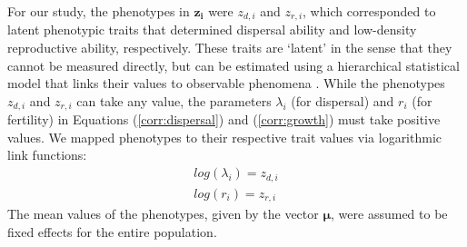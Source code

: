 For our study, the phenotypes in $\bm{z_{i}}$ were $z_{d,i}$ and $z_{r,i}$, which corresponded to latent phenotypic traits that determined dispersal ability and low-density reproductive ability, respectively. These traits are `latent' in the sense that they cannot be measured directly, but can be estimated using a hierarchical statistical model that links their values to observable phenomena . While the phenotypes $z_{d,i}$ and $z_{r,i}$ can take any value, the parameters $\lambda_{i}$ (for dispersal) and $r_{i}$ (for fertility) in Equations (\ref{corr:dispersal}) and (\ref{corr:growth}) must take positive values. We mapped phenotypes to their respective trait values via logarithmic link functions:
%
\begin{gather} \label{corr:linkFunctions}
  log(\lambda_{i}) = z_{d,i} \\
  log(r_{i}) = z_{r,i}
\end{gather}
%
The mean values of the phenotypes, given by the vector $\bm{\mu}$, were assumed to be fixed effects for the entire population.

